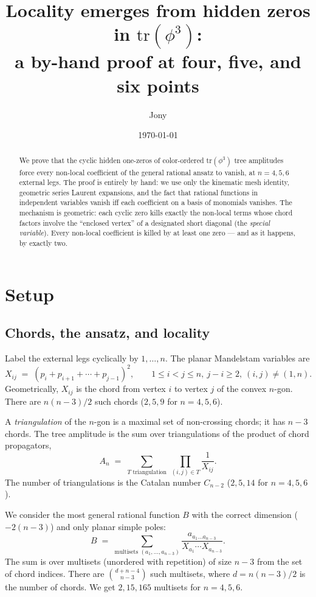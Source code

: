 \documentclass[11pt]{article}
\title{Locality emerges from hidden zeros in \texorpdfstring{$\mathrm{tr}(\phi^3)$}{tr(phi^3)}:\\
a by-hand proof at four, five, and six points}
\author{Jony}
\date{\today}
\newcommand{\X}[2]{X_{#1#2}}
\theoremstyle{definition}
\begin{document}
\maketitle

\begin{abstract}
We prove that the cyclic hidden one-zeros of color-ordered $\mathrm{tr}(\phi^3)$
tree amplitudes force every non-local coefficient of the general rational
ansatz to vanish, at $n=4, 5, 6$ external legs. The proof is entirely by hand:
we use only the kinematic mesh identity, geometric series Laurent expansions,
and the fact that rational functions in independent variables vanish iff
each coefficient on a basis of monomials vanishes.
The mechanism is geometric: each cyclic zero kills exactly the non-local
terms whose chord factors involve the ``enclosed vertex'' of a designated
short diagonal (the \emph{special variable}). Every non-local coefficient is
killed by at least one zero --- and as it happens, by exactly two.
\end{abstract}

\tableofcontents

\section{Setup}

\subsection{Chords, the ansatz, and locality}

Label the external legs cyclically by $1,\ldots,n$. The planar Mandelstam
variables are
\[
\X{i}{j} \;=\; (p_i+p_{i+1}+\cdots+p_{j-1})^2,\qquad 1\le i<j\le n,\ j-i\ge 2,\ (i,j)\ne(1,n).
\]
Geometrically, $\X{i}{j}$ is the chord from vertex $i$ to vertex $j$ of the
convex $n$-gon. There are $n(n-3)/2$ such chords ($2,5,9$ for $n=4,5,6$).

A \emph{triangulation} of the $n$-gon is a maximal set of non-crossing chords;
it has $n-3$ chords. The tree amplitude is the sum over triangulations of the
product of chord propagators,
\[
A_n \;=\;\sum_{T\text{ triangulation}}\ \prod_{(i,j)\in T}\frac{1}{\X{i}{j}}.
\]
The number of triangulations is the Catalan number $C_{n-2}$ ($2, 5, 14$
for $n=4,5,6$).

We consider the most general rational function $B$ with the correct dimension
($-2(n-3)$) and only planar simple poles:
\[
B \;=\; \sum_{\text{multisets }(a_1,\ldots,a_{n-3})}
\frac{a_{a_1\ldots a_{n-3}}}{X_{a_1}\cdots X_{a_{n-3}}}.
\]
The sum is over multisets (unordered with repetition) of size $n-3$ from
the set of chord indices. There are $\binom{d+n-4}{n-3}$ such multisets,
where $d=n(n-3)/2$ is the number of chords. We get $2, 15, 165$ multisets
for $n=4,5,6$.
\end{document}
